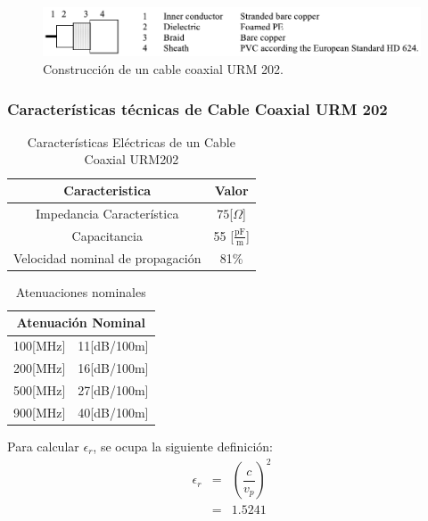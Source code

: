 \documentclass[11pt,onecolumn]{article}
\begin{document}
\begin{figure}[H]
\centering
\includegraphics[scale=1]{img/URM202.pdf}
\caption{Construcción de un cable coaxial URM 202.}
\label{urm202}
\end{figure}

\subsubsection{Características técnicas de Cable Coaxial URM 202}

\begin{multicols}{2}

\begin{table}[H]
\centering
\begin{tabular}{|c|c|}
\hline 
Caracteristica & Valor \\ 
\hline 
Impedancia Característica & $75$[$\Omega$] \\ 
\hline 
Capacitancia & 55 [$\frac{\mbox{pF}}{\mbox{m}}$] \\ 
\hline 
Velocidad nominal de propagación & 81\% \\ 
\hline 
\end{tabular} 
\caption{Características Eléctricas de un Cable Coaxial URM202}
\end{table}

\begin{table}[H]
\centering
\begin{tabular}{|c|c|}
\hline 
\multicolumn{2}{|c|}{Atenuación Nominal} \\ 
\hline 
100[MHz] & 11[dB/100m] \\ 
\hline 
200[MHz] & 16[dB/100m] \\ 
\hline 
500[MHz] & 27[dB/100m] \\ 
\hline 
900[MHz] & 40[dB/100m] \\ 
\hline 
\end{tabular} 
\caption{Atenuaciones nominales}
\label{aten}
\end{table}

\end{multicols}

Para calcular $\epsilon_{r}$, se ocupa la siguiente definición:
\begin{eqnarray}
\epsilon_{r} & = & \left(\dfrac{c}{v_{p}}\right)^{2}\nonumber \\
			 & = & 1.5241\label{eqn:er}
\end{eqnarray}
\end{document}

